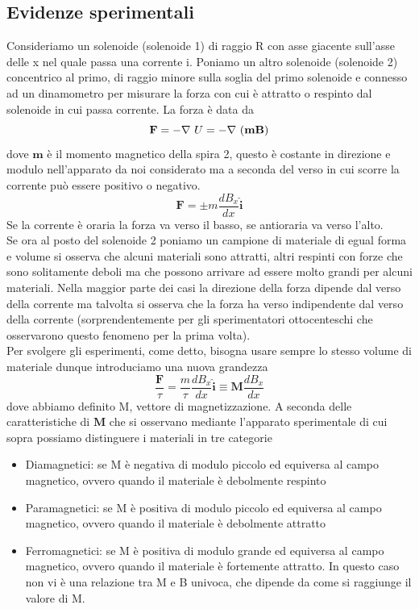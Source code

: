 \documentclass[10pt,a4paper]{article}
\def\n{\ensuremath\nabla}
\def\n{\ensuremath\nabla\ }
\begin{document}
\subsection{Evidenze sperimentali}
Consideriamo un solenoide (solenoide 1) di raggio R con asse giacente sull'asse delle x nel quale passa una corrente i. Poniamo un altro solenoide (solenoide 2) concentrico al primo, di raggio minore sulla soglia del primo solenoide e connesso ad un dinamometro per misurare la forza con cui è attratto o respinto dal solenoide in cui passa corrente. La forza è data da 
\[\mathbf{F} = -\n U = -\n(\mathbf{m}\mathbf{B})\]
dove \(\mathbf{m}\) è il momento magnetico della spira 2, questo è costante in direzione e modulo nell'apparato da noi considerato ma a seconda del verso in cui scorre la corrente può essere positivo o negativo.
\[\mathbf{F}=\pm m \frac{d B_x}{dx}\mathbf{\hat{i}}\]
Se la corrente è oraria la forza va verso il basso, se antioraria va verso l'alto.\\
Se ora al posto del solenoide 2 poniamo un campione di materiale di egual forma e volume si osserva che alcuni materiali sono attratti, altri respinti con forze che sono solitamente deboli ma che possono arrivare ad essere molto grandi per alcuni materiali. Nella maggior parte dei casi la direzione della forza dipende dal verso della corrente ma talvolta si osserva che la forza ha verso indipendente dal verso della corrente (sorprendentemente per gli sperimentatori ottocenteschi che osservarono questo fenomeno per la prima volta).\\
Per svolgere gli esperimenti, come detto, bisogna usare sempre lo stesso volume di materiale dunque introduciamo una nuova grandezza
\[\frac{\mathbf{F}}{\tau} = \frac{m}{\tau}\frac{d B_x}{dx}\mathbf{\hat{i}}\equiv \mathbf{M}\frac{dB_x}{dx}\]
dove abbiamo definito M, vettore di magnetizzazione. A seconda delle caratteristiche di \(\mathbf{M}\) che si osservano mediante l'apparato sperimentale di cui sopra possiamo distinguere i materiali in tre categorie
\begin{itemize}
	\item Diamagnetici: se M è negativa di modulo piccolo ed equiversa al campo magnetico, ovvero quando il materiale è debolmente respinto
	\item Paramagnetici: se M è positiva di modulo piccolo ed equiversa al campo magnetico, ovvero quando il materiale è debolmente attratto
	\item Ferromagnetici: se M è positiva di modulo grande ed equiversa al campo magnetico, ovvero quando il materiale è fortemente attratto. In questo caso non vi è una relazione tra M e B univoca, che dipende da come si raggiunge il valore di M. 
\end{itemize}
\end{document}
